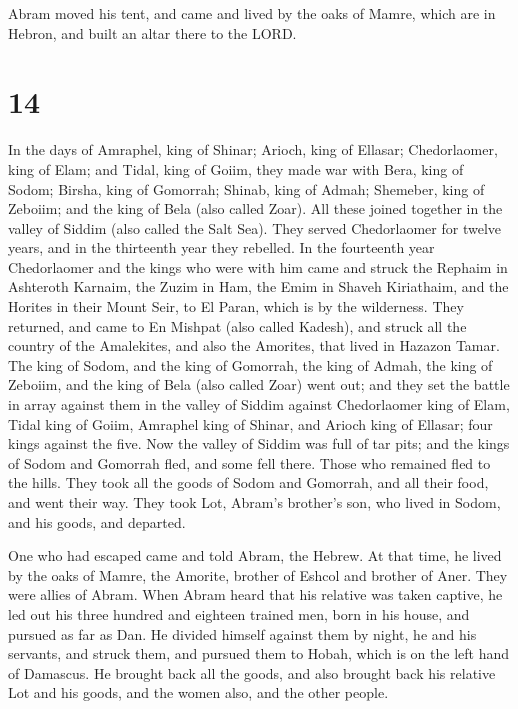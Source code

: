  Abram moved his tent, and came and lived by the oaks of
Mamre, which are in Hebron, and built an altar there to the LORD.

\hypertarget{section-13}{%
\section{14}\label{section-13}}

 In the days of Amraphel, king of Shinar; Arioch, king of
Ellasar; Chedorlaomer, king of Elam; and Tidal, king of Goiim,
 they made war with Bera, king of Sodom; Birsha, king of
Gomorrah; Shinab, king of Admah; Shemeber, king of Zeboiim; and the king
of Bela (also called Zoar).  All these joined together in
the valley of Siddim (also called the Salt Sea).  They
served Chedorlaomer for twelve years, and in the thirteenth year they
rebelled.  In the fourteenth year Chedorlaomer and the kings
who were with him came and struck the Rephaim in Ashteroth Karnaim, the
Zuzim in Ham, the Emim in Shaveh Kiriathaim,  and the
Horites in their Mount Seir, to El Paran, which is by the wilderness.
 They returned, and came to En Mishpat (also called Kadesh),
and struck all the country of the Amalekites, and also the Amorites,
that lived in Hazazon Tamar.  The king of Sodom, and the
king of Gomorrah, the king of Admah, the king of Zeboiim, and the king
of Bela (also called Zoar) went out; and they set the battle in array
against them in the valley of Siddim  against Chedorlaomer
king of Elam, Tidal king of Goiim, Amraphel king of Shinar, and Arioch
king of Ellasar; four kings against the five.  Now the
valley of Siddim was full of tar pits; and the kings of Sodom and
Gomorrah fled, and some fell there. Those who remained fled to the
hills.  They took all the goods of Sodom and Gomorrah, and
all their food, and went their way.  They took Lot, Abram's
brother's son, who lived in Sodom, and his goods, and departed.

 One who had escaped came and told Abram, the Hebrew. At
that time, he lived by the oaks of Mamre, the Amorite, brother of Eshcol
and brother of Aner. They were allies of Abram.  When Abram
heard that his relative was taken captive, he led out his three hundred
and eighteen trained men, born in his house, and pursued as far as Dan.
 He divided himself against them by night, he and his
servants, and struck them, and pursued them to Hobah, which is on the
left hand of Damascus.  He brought back all the goods, and
also brought back his relative Lot and his goods, and the women also,
and the other people.

